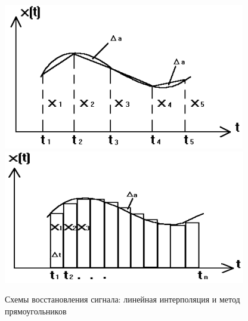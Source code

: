 	\begin{figure}[H]
		\centering
		\begin{minipage}[t]{0.48\linewidth}
			\centering
			\includegraphics[width=\linewidth, height=0.2\textheight]{img/03_04}
		\end{minipage}%
		\hfill
		\begin{minipage}[t]{0.48\linewidth}
			\centering
			\includegraphics[width=\linewidth, height=0.2\textheight]{img/03_05}
		\end{minipage}
		\small{Схемы восстановления сигнала: линейная интерполяция и метод прямоугольников}
		\label{fig:05_combined}
	\end{figure}
	
	\newpage
	
